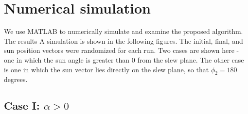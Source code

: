 \documentclass[letterpaper, preprint, paper,11pt]{AAS}	%
\begin{document}
%	
%	
	\section{Numerical simulation} 
	We use MATLAB to numerically simulate and examine the proposed algorithm. The results A simulation is shown in the following figures. The initial, final, and sun position vectors were randomized for each run. Two cases are shown here - one in which the sun angle is greater than 0 from the slew plane. The other case is one in which the sun vector lies directly on the slew plane, so that $\phi_2 = 180$ degrees. 
		
		\subsection{Case I: $\alpha > 0$} 
		
\end{document}

